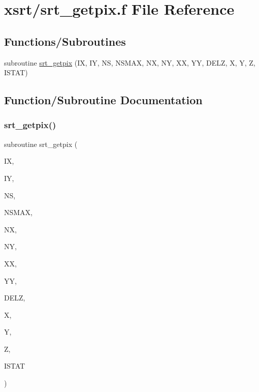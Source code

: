 \hypertarget{srt__getpix_8f}{}\section{xsrt/srt\+\_\+getpix.f File Reference}
\label{srt__getpix_8f}
\subsection*{Functions/\+Subroutines}
\begin{DoxyCompactItemize}
\item 
subroutine \hyperlink{srt__getpix_8f_a8ebfa7e6ec65fbc74b6767717c8521a6}{srt\+\_\+getpix} (IX, IY, NS, N\+S\+M\+AX, NX, NY, XX, YY, D\+E\+LZ, X, Y, Z, I\+S\+T\+AT)
\end{DoxyCompactItemize}


\subsection{Function/\+Subroutine Documentation}
\mbox{\label{srt__getpix_8f_a8ebfa7e6ec65fbc74b6767717c8521a6}} 
\subsubsection{\texorpdfstring{srt\+\_\+getpix()}{srt\_getpix()}}
{\footnotesize\ttfamily subroutine srt\+\_\+getpix (\begin{DoxyParamCaption}\item[{integer}]{IX,  }\item[{integer}]{IY,  }\item[{integer}]{NS,  }\item[{integer}]{N\+S\+M\+AX,  }\item[{integer}]{NX,  }\item[{integer}]{NY,  }\item[{double precision, dimension(nx)}]{XX,  }\item[{double precision, dimension(ny)}]{YY,  }\item[{double precision, dimension(nx,ny,nsmax)}]{D\+E\+LZ,  }\item[{double precision}]{X,  }\item[{double precision}]{Y,  }\item[{double precision}]{Z,  }\item[{integer}]{I\+S\+T\+AT }\end{DoxyParamCaption})}

